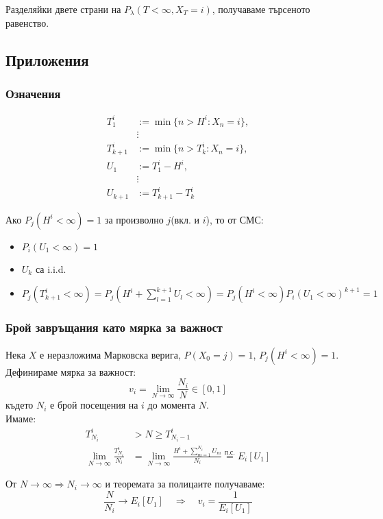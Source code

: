 \documentclass{article}
\begin{document}
Разделяйки двете страни на $P_\lambda(T<\infty,X_T=i)$, получаваме търсеното равенство.

\subsection{Приложения}
\subsubsection*{Означения}
\begin{align*}
T_1^i &:= \min\{n > H^i : X_n = i\}, \\
&\vdots \\
T_{k+1}^i &:= \min\{n > T_k^i : X_n = i\}, \\
U_1 &:= T_1^i - H^i, \\
&\vdots \\
U_{k+1} &:= T_{k+1}^i - T_k^i
\end{align*}

Ако $P_j(H^i<\infty)=1$ за произволно $j$(вкл. и $i$), то от СМС:
\begin{itemize}
\item $P_i(U_1<\infty)=1$
\item $U_k$ са i.i.d.
\item $P_j(T_{k+1}^i<\infty) = P_j\left(H^i + \sum_{l=1}^{k+1} U_l < \infty\right) = P_j(H^i<\infty)P_i(U_1<\infty)^{k+1} = 1$
\end{itemize}

\subsubsection*{Брой завръщания като мярка за важност}
Нека $X$ е неразложима Марковска верига, $P(X_0=j)=1$, $P_j(H^i<\infty)=1$. \\

Дефинираме мярка за важност:
$$v_i = \lim_{N\to\infty} \frac{N_i}{N} \in [0,1]$$
където $N_i$ е брой посещения на $i$ до момента $N$. \\

Имаме:
\begin{align*}
T_{N_i}^i &> N \geq T_{N_i-1}^i \\
\lim_{N\to\infty} \frac{T_{N_i}^i}{N_i} &= \lim_{N\to\infty} \frac{H^i + \sum_{m=1}^{N_i} U_m}{N_i} \overset{\text{п.с.}}{=} E_i[U_1]
\end{align*}

От $N\to\infty \Rightarrow N_i\to\infty$ и теоремата за полицаите получаваме:
$$\frac{N}{N_i} \to E_i[U_1] \quad \Rightarrow \quad v_i = \frac{1}{E_i[U_1]}$$
\end{document}
